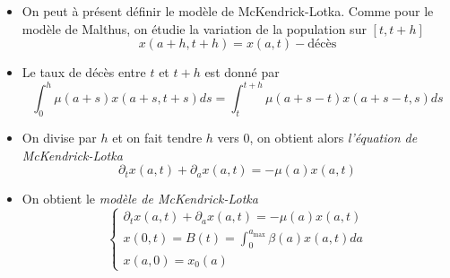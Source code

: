 \begin{frame}
    \begin{itemize}
        \item On peut à présent définir le modèle de McKendrick-Lotka. Comme pour le modèle de Malthus, on étudie la variation de la population sur $[t,t+h]$
        \begin{equation*}
            x(a+h,t+h) = x(a,t) - \text{décès}
        \end{equation*} \pause 
        \item Le taux de décès entre $t$ et $t+h$ est donné par
        \begin{equation*}
            \int_0^{h}\mu(a+s)x(a+s,t+s)ds = \int_t^{t+h}\mu(a+s-t)x(a+s-t,s)d s
        \end{equation*} \pause  
        \item On divise par $h$ et on fait tendre $h$ vers $0$, on obtient alors \textcolor{astral}{\textit{l'équation de McKendrick-Lotka}}
        \begin{equation*}
            \partial_tx(a,t)+\partial_ax(a,t) = -\mu(a)x(a,t)
        \end{equation*} \pause
        \item On obtient le \textcolor{astral}{\textit{modèle de McKendrick-Lotka}}
        \begin{equation*}
            \left\{\begin{array}{l}
            \partial_t x(a,t) + \partial_a x(a,t) = -\mu(a)x(a,t) \\
            x(0,t) = B(t) = \displaystyle{\int_0^{a_{\max}}} \beta (a)x(a,t)d a \\
            x(a,0) = x_0(a)
            \end{array}\right.
        \end{equation*}
    \end{itemize}
\end{frame}